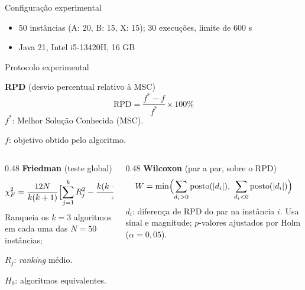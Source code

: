 \documentclass{beamer}
\begin{document}
\begin{frame}{Configuração experimental}
    \begin{itemize}
        \item 50 instâncias (A: 20, B: 15, X: 15); 30 execuções, limite de 600 s
        \item Java 21, Intel i5-13420H, 16 GB
    \end{itemize}
\end{frame}

\begin{frame}{Protocolo experimental}

    \textbf{RPD} (desvio percentual relativo à MSC)
    \[
        \text{RPD} = \frac{f^\ast - f}{f^\ast} \times 100\%
    \]
    $f^\ast$: Melhor Solução Conhecida (MSC).

    $f$: objetivo obtido pelo algoritmo.

    \bigskip

    \footnotesize
    \begin{columns}[t]
        \begin{column}{0.48\textwidth}
            \textbf{Friedman} (teste global)
            \[
                \chi^2_F = \frac{12N}{k(k+1)} \Bigl[\sum_{j=1}^{k} R_j^2 - \frac{k(k+1)^2}{4}\Bigr]
            \]
            Ranqueia os $k = 3$ algoritmos em cada uma das $N = 50$ instâncias;

            $R_j$: \textit{ranking} médio.

            $H_0$: algoritmos equivalentes.
        \end{column}
        \begin{column}{0.48\textwidth}
            \textbf{Wilcoxon} (par a par, sobre o RPD)
            \[
                W = \min\Bigl(\sum_{d_i > 0} \text{posto}(|d_i|),\ \sum_{d_i < 0} \text{posto}(|d_i|)\Bigr)
            \]
            $d_i$: diferença de RPD do par na instância $i$. Usa sinal e magnitude; $p$-valores ajustados por Holm ($\alpha = 0{,}05$).
        \end{column}
    \end{columns}
\end{frame}
\end{document}
